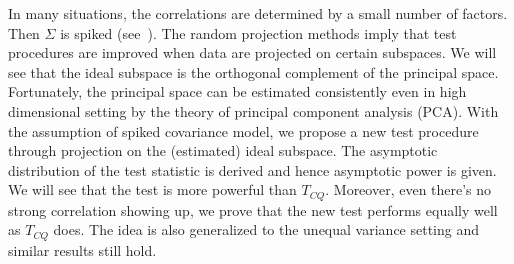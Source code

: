\documentclass[review]{elsarticle}
\theoremstyle{plain}
\theoremstyle{definition}
\theoremstyle{remark}
\begin{document}
In many situations, the correlations are determined by a small number of factors.
Then $\Sigma$ is spiked (see~\cite{Cai2012Sparse}).
The random projection methods imply that test procedures are improved when data are projected on certain subspaces.
We will see that the ideal subspace is the orthogonal complement of the principal space.
Fortunately, the principal space can be estimated consistently even in high dimensional setting by the theory of principal component analysis (PCA).
With the assumption of spiked covariance model, we propose a new test procedure through projection on the (estimated) ideal subspace.  
The asymptotic distribution of the test statistic is derived and hence asymptotic power is given.
We will see that the test is more powerful than $T_{CQ}$.
Moreover, even there's no strong correlation showing up, we prove that the new test performs equally well as $T_{CQ}$ does. The idea is also generalized to the unequal variance setting and similar results still hold.



\end{document}
